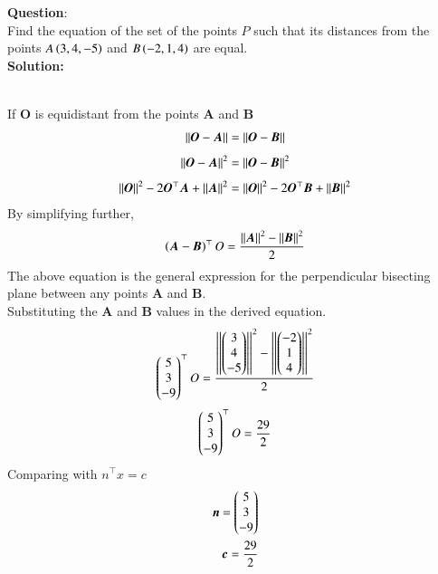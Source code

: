 \documentclass[journal]{IEEEtran}
\begin{document}
\textbf{Question}:\\
Find the equation of the set of the points $P$ such that its distances from the points
$A\left(3, 4, -5\right)$ and $B\left(-2, 1, 4\right)$ are equal.
\\ \textbf{Solution: }\\
    \begin{table}[h!]    
      \centering
      
      \caption{}
    \end{table}\\
If \textbf{O} is equidistant from the points \textbf{A} and \textbf{B}
    \begin{align}
        \left\vert\left\vert\boldsymbol{O}-\boldsymbol{A}\right\vert\right\vert = \left\vert\left\vert\boldsymbol{O}-\boldsymbol{B}\right\vert\right\vert\label{eq1.1.8.28.1}
    \end{align}
     \begin{align}
        \left\vert\left\vert\boldsymbol{O}-\boldsymbol{A}\right\vert\right\vert^2 = \left\vert\left\vert\boldsymbol{O}-\boldsymbol{B}\right\vert\right\vert^2\label{eq1.1.8.28.2}
    \end{align}
    \begin{align}
    	\left\vert\left\vert\boldsymbol{O}\right\vert\right\vert^2 - 2\boldsymbol{O}^\top \boldsymbol{A} + \left\vert\left\vert\boldsymbol{A}\right\vert\right\vert^2 = \left\vert\left\vert\boldsymbol{O}\right\vert\right\vert^2 - 2\boldsymbol{O}^\top\boldsymbol{B} + \left\vert\left\vert\boldsymbol{B}\right\vert\right\vert^2\label{eq1.1.8.28.3}
    \end{align}
By simplifying further,
    \begin{align}
    	\left(\boldsymbol{A}-\boldsymbol{B}\right)^\top O = \frac{\left\vert\left\vert\boldsymbol{A}\right\vert\right\vert^2-\left\vert\left\vert\boldsymbol{B}\right\vert\right\vert^2}{2}\label{eq1.1.8.28.4}
    \end{align}
The above equation is the general expression for the perpendicular bisecting plane between any points $\boldsymbol{A}$ and $\boldsymbol{B}$.\\
Substituting the $\boldsymbol{A}$ and $\boldsymbol{B}$ values in the derived equation.\\
    \begin{align}
    	\begin{pmatrix}5 \\ 3 \\ -9\end{pmatrix}^\top O = \frac{\left\vert\left\vert\begin{pmatrix}3 \\ 4\\-5\end{pmatrix}\right\vert\right\vert^2-\left\vert\left\vert\begin{pmatrix}-2\\ 1\\4\end{pmatrix}\right\vert\right\vert^2}{2}\label{eq1.1.8.28.5}
    \end{align}
    \begin{align}
    	\begin{pmatrix}5 \\ 3 \\ -9\end{pmatrix}^\top O = \frac{29}{2}\label{eq1.1.8.28.6}
    \end{align}
Comparing with $n^\top x = c$
    \begin{align}
    	\boldsymbol{n} = \begin{pmatrix}5 \\ 3 \\ -9\end{pmatrix}\\ \label{eq1.1.8.28.7}
	    \boldsymbol{c} = \frac{29}{2}
    \end{align}
\end{document}
